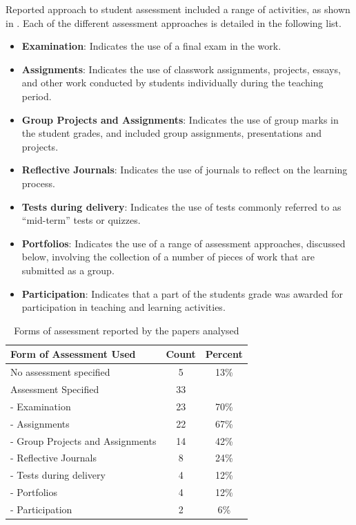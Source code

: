 Reported approach to student assessment included a range of activities, as shown in . Each of the different assessment approaches is detailed in the following list. %

\begin{itemize}[noitemsep,nolistsep]
	\item \textbf{Examination}: Indicates the use of a final exam in the work.
	\item \textbf{Assignments}: Indicates the use of classwork assignments, projects, essays, and other work conducted by students individually during the teaching period.
	\item \textbf{Group Projects and Assignments}: Indicates the use of group marks in the student grades, and included group assignments, presentations and projects.
	\item \textbf{Reflective Journals}: Indicates the use of journals to reflect on the learning process.
	\item \textbf{Tests during delivery}: Indicates the use of tests commonly referred to as ``mid-term'' tests or quizzes.
	\item \textbf{Portfolios}: Indicates the use of a range of assessment approaches, discussed below, involving the collection of a number of pieces of work that are submitted as a group.
	\item \textbf{Participation}: Indicates that a part of the students grade was awarded for participation in teaching and learning activities.
\end{itemize}

\begin{table}[htbp]
	\centering
	\caption{Forms of assessment reported by the papers analysed}
	\label{tbl:assessment_types}
	\footnotesize
    \begin{tabular}{l|c|c}
     \textbf{Form of Assessment Used} & \textbf{Count} & \textbf{Percent} \\ \hline
No assessment specified & 	5 & 13\% \\
Assessment Specified	 & 33 & 	 \\
- Examination	 & 23	 & 70\% \\
- Assignments	 & 22	 & 67\% \\
- Group Projects and Assignments	 & 14	 & 42\% \\
- Reflective Journals & 	8	 & 24\% \\
- Tests during delivery & 	4	 & 12\% \\
- Portfolios & 	4	 & 12\% \\
- Participation &	2 & 	6\% \\
    \end{tabular}
\end{table}

